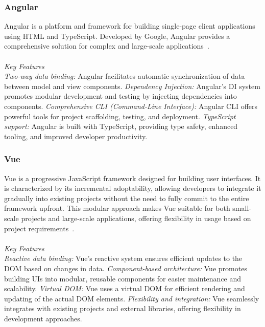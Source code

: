 \documentclass[conference]{IEEEtran}
\begin{document}
\subsubsection{Angular}

Angular is a platform and framework for building single-page client applications using HTML and TypeScript. Developed by Google, Angular provides a comprehensive solution for complex and large-scale applications~\cite{angular-io}.
\\\\
\textit{Key Features}\\
\textit{Two-way data binding:} Angular facilitates automatic synchronization of data between model and view components.
\newline\textit{Dependency Injection:} Angular's DI system promotes modular development and testing by injecting dependencies into components.
\newline\textit{Comprehensive CLI (Command-Line Interface):} Angular CLI offers powerful tools for project scaffolding, testing, and deployment.
\newline\textit{TypeScript support:} Angular is built with TypeScript, providing type safety, enhanced tooling, and improved developer productivity.
\newline
\subsubsection{Vue}

Vue is a progressive JavaScript framework designed for building user interfaces. It is characterized by its incremental adoptability, allowing developers to integrate it gradually into existing projects without the need to fully commit to the entire framework upfront. This modular approach makes Vue suitable for both small-scale projects and large-scale applications, offering flexibility in usage based on project requirements~\cite{vuejs2024}.
\\\\
\textit{Key Features}\\
\textit{Reactive data binding:} Vue's reactive system ensures efficient updates to the DOM based on changes in data.
\newline\textit{Component-based architecture:} Vue promotes building UIs into modular, reusable components for easier maintenance and scalability.
\newline\textit{Virtual DOM:} Vue uses a virtual DOM for efficient rendering and updating of the actual DOM elements.
\newline\textit{Flexibility and integration:} Vue seamlessly integrates with existing projects and external libraries, offering flexibility in development approaches.
\end{document}
